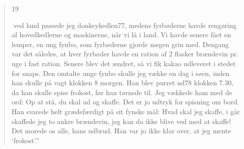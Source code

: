 \begin{quote}
19

ved land passede jeg donkeykedlen77, medens fyrbøderne havde rengøring
af hovedkedlerne og maskinerne, når vi lå i land. Vi havde senere fået
en lemper, en ung fynbo, som fyrbøderne gjorde megen grin med. Dengang
var det således, at hver fyrbøder havde en ration af 2 flasker brændevin
pr. uge i fast ration. Senere blev det ændret, så vi fik kakao udleveret
i stedet for snaps. Den omtalte unge fynbo skulle jeg vække en dag i
søen, inden han skulle på vagt klokken 8 morgen. Han blev purret ud78
klokken 7.30, da han skulle spise frokost, før han tørnede til. Jeg
vækkede ham med de ord: Op at stå, du skal ud og skaffe. Det er jo
udtryk for spisning om bord. Han svarede helt grædefærdigt på sit fynske
mål: Hvad skal jeg skaffe, i går skaffede jeg to ankre brændevin, jeg
kan da ikke blive ved med at skaffe! Det morede os alle, hans udbrud.
Han var jo ikke klar over, at jeg mente `frokost'.''
\end{quote}
